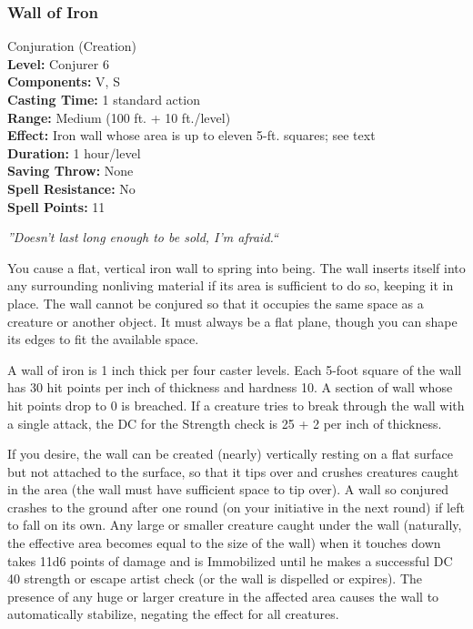 \subsubsection{Wall of Iron}
\label{Spell:WallOfIron}
Conjuration (Creation)
\\ \textbf{Level:} Conjurer 6
\\ \textbf{Components:} V, S
\\ \textbf{Casting Time:} 1 standard action
\\ \textbf{Range:} Medium (100 ft. + 10 ft./level)
\\ \textbf{Effect:} Iron wall whose area is up to eleven 5-ft. squares; see text
\\ \textbf{Duration:} 1 hour/level
\\ \textbf{Saving Throw:} None
\\ \textbf{Spell Resistance:} No
\\ \textbf{Spell Points:} 11

\emph{''Doesn't last long enough to be sold, I'm afraid.``}

You cause a flat, vertical iron wall to spring into being. 
The wall inserts itself into any surrounding nonliving material if its area is sufficient to do so,
keeping it in place. 
The wall cannot be conjured so that it occupies the same space as a creature or another object. 
It must always be a flat plane, though you can shape its edges to fit the available space.

A wall of iron is 1 inch thick per four caster levels. %
Each 5-foot square of the wall has 30 hit points per inch of thickness and hardness 10. 
A section of wall whose hit points drop to 0 is breached. 
If a creature tries to break through the wall with a single attack, the DC for the Strength check is 25 + 2 per inch of thickness.

If you desire, the wall can be created (nearly) vertically resting on a flat surface but not attached to the surface, 
so that it tips over and crushes creatures caught in the area (the wall must have sufficient space to tip over). 
A wall so conjured crashes to the ground after one round (on your initiative in the next round) if left to fall on its own.
Any large or smaller creature caught under the wall (naturally, the effective area becomes equal to the size of the wall)
when it touches down takes 11d6 points of damage and is Immobilized until he makes a successful DC 40 strength or escape artist check 
(or the wall is dispelled or expires).
The presence of any huge or larger creature in the affected area causes the wall to automatically stabilize, negating the effect for all creatures.


